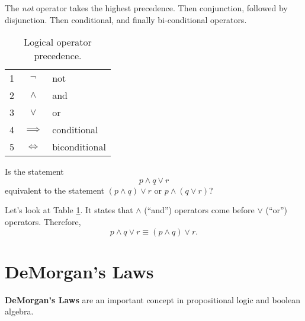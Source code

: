 The \emph{not} operator takes the highest precedence.
Then conjunction, followed by disjunction.
Then conditional, and finally bi-conditional operators.
\begin{table}[H]
  \centering
    \begin{tabular}{r|cl}
      1 & $\neg$      &not\\
      2 & $\land$     &and \\
      3 & $\lor$      & or \\
      4 & $\implies$  & conditional \\
      5 & $\iff$      &biconditional
    \end{tabular}
  \caption{Logical operator precedence.}
  \label{tab:precedence}
\end{table}
\begin{ex}
  Is the statement \[ p \land q \lor r \] equivalent to the statement
  \( ( p \land q ) \lor r\)
  or \( p \land (q \lor r)\)?
  \begin{sol}
    Let's look at Table \ref{tab:precedence}.
    It states that $\land$ (``and'') operators come before $\lor$ (``or'') operators.
    Therefore,
    \[ p \land q \lor r \equiv (p \land q) \lor r \text{.}\]
  \end{sol}
\end{ex}

\section{DeMorgan's Laws}
\textbf{DeMorgan's Laws} are an important concept in propositional logic and boolean algebra.

